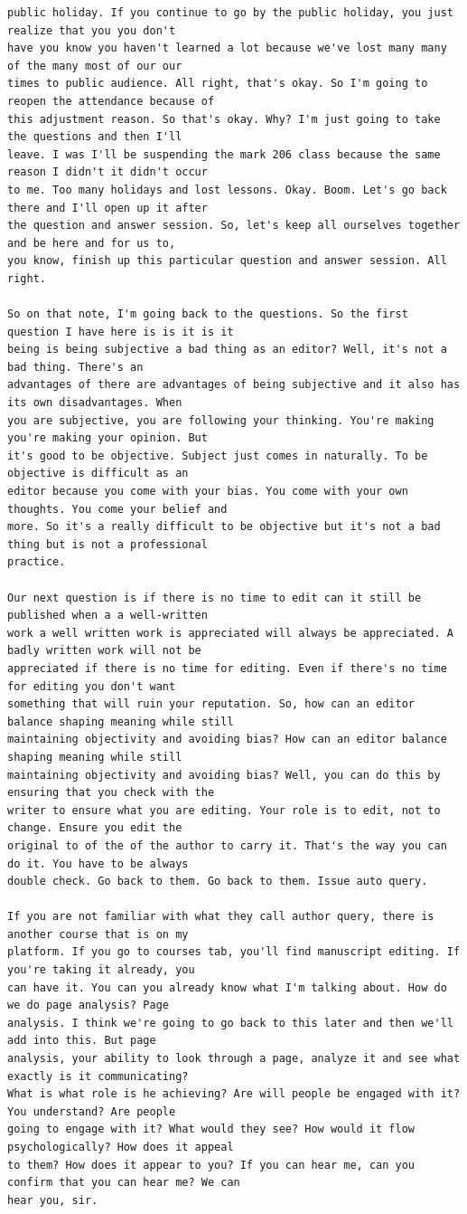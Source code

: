 {\begin{Verbatim}
public holiday. If you continue to go by the public holiday, you just realize that you you don't
have you know you haven't learned a lot because we've lost many many of the many most of our our
times to public audience. All right, that's okay. So I'm going to reopen the attendance because of
this adjustment reason. So that's okay. Why? I'm just going to take the questions and then I'll
leave. I was I'll be suspending the mark 206 class because the same reason I didn't it didn't occur
to me. Too many holidays and lost lessons. Okay. Boom. Let's go back there and I'll open up it after
the question and answer session. So, let's keep all ourselves together and be here and for us to,
you know, finish up this particular question and answer session. All right.

So on that note, I'm going back to the questions. So the first question I have here is is it is it
being is being subjective a bad thing as an editor? Well, it's not a bad thing. There's an
advantages of there are advantages of being subjective and it also has its own disadvantages. When
you are subjective, you are following your thinking. You're making you're making your opinion. But
it's good to be objective. Subject just comes in naturally. To be objective is difficult as an
editor because you come with your bias. You come with your own thoughts. You come your belief and
more. So it's a really difficult to be objective but it's not a bad thing but is not a professional
practice.

Our next question is if there is no time to edit can it still be published when a a well-written
work a well written work is appreciated will always be appreciated. A badly written work will not be
appreciated if there is no time for editing. Even if there's no time for editing you don't want
something that will ruin your reputation. So, how can an editor balance shaping meaning while still
maintaining objectivity and avoiding bias? How can an editor balance shaping meaning while still
maintaining objectivity and avoiding bias? Well, you can do this by ensuring that you check with the
writer to ensure what you are editing. Your role is to edit, not to change. Ensure you edit the
original to of the of the author to carry it. That's the way you can do it. You have to be always
double check. Go back to them. Go back to them. Issue auto query.

If you are not familiar with what they call author query, there is another course that is on my
platform. If you go to courses tab, you'll find manuscript editing. If you're taking it already, you
can have it. You can you already know what I'm talking about. How do we do page analysis? Page
analysis. I think we're going to go back to this later and then we'll add into this. But page
analysis, your ability to look through a page, analyze it and see what exactly is it communicating?
What is what role is he achieving? Are will people be engaged with it? You understand? Are people
going to engage with it? What would they see? How would it flow psychologically? How does it appeal
to them? How does it appear to you? If you can hear me, can you confirm that you can hear me? We can
hear you, sir.


\end{Verbatim}}
